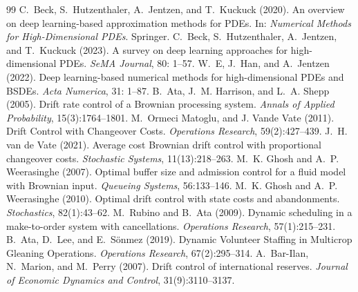\documentclass[11pt]{article}
\theoremstyle{definition}
\theoremstyle{plain}
\begin{document}
\begin{appendices}
\iffalse
\begin{thebibliography}{99}
 C.~Beck, S.~Hutzenthaler, A.~Jentzen, and T.~Kuckuck (2020). \newblock An overview on deep learning-based approximation methods for PDEs. \newblock In: \emph{Numerical Methods for High-Dimensional PDEs}. Springer.
 C.~Beck, S.~Hutzenthaler, A.~Jentzen, and T.~Kuckuck (2023). \newblock A survey on deep learning approaches for high-dimensional PDEs. \newblock \emph{SeMA Journal}, 80: 1--57.
 W.~E, J.~Han, and A.~Jentzen (2022). \newblock Deep learning-based numerical methods for high-dimensional PDEs and BSDEs. \newblock \emph{Acta Numerica}, 31: 1--87.
 B.~Ata, J.~M. Harrison, and L.~A. Shepp (2005). \newblock Drift rate control of a Brownian processing system. \newblock \emph{Annals of Applied Probability}, 15(3):1764--1801.
 M.~Ormeci Matoglu, and J. Vande Vate (2011). \newblock Drift Control with Changeover Costs. \newblock \emph{Operations Research}, 59(2):427--439.
 J.~H. van de Vate (2021). \newblock Average cost Brownian drift control with proportional changeover costs. \newblock \emph{Stochastic Systems}, 11(13):218--263.
 M.~K. Ghosh and A.~P. Weerasinghe (2007). \newblock Optimal buffer size and admission control for a fluid model with Brownian input. \newblock \emph{Queueing Systems}, 56:133--146.
 M.~K. Ghosh and A.~P. Weerasinghe (2010). \newblock Optimal drift control with state costs and abandonments. \newblock \emph{Stochastics}, 82(1):43--62.
 M.~Rubino and B.~Ata (2009). \newblock Dynamic scheduling in a make-to-order system with cancellations. \newblock \emph{Operations Research}, 57(1):215--231.
 B.~Ata, D.~Lee, and E.~Sönmez (2019). \newblock Dynamic Volunteer Staffing in Multicrop Gleaning Operations. \newblock \emph{Operations Research}, 67(2):295--314.
 A.~Bar-Ilan, N.~Marion, and M.~Perry (2007). \newblock Drift control of international reserves. \newblock \emph{Journal of Economic Dynamics and Control}, 31(9):3110--3137.

\end{thebibliography}
\end{appendices}
\end{document}
